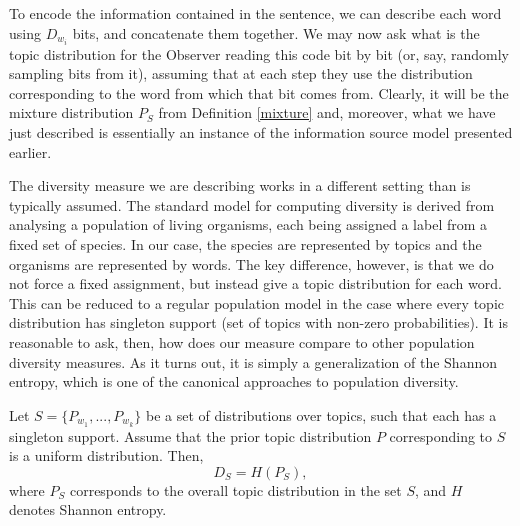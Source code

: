 To encode the information contained in the sentence, we can describe
each word using $D_{w_i}$ bits, and concatenate them together. We may
now ask what is the topic distribution for the Observer reading this
code bit by bit (or, say, randomly sampling bits from it), assuming
that at each step they use the distribution corresponding to the word
from which that bit comes from. Clearly, it will be the mixture
distribution $P_S$ from Definition \ref{mixture} and, moreover, what
we have just described is essentially an instance of the information
source model presented earlier. 

The diversity measure we are describing works in a different setting
than is typically assumed. The standard model for computing diversity
is derived from analysing a population of living organisms, each being
assigned a label from a fixed set of species. In our case, the species
are represented by topics and the organisms are represented by
words. The key difference, however, is that we do not force a fixed
assignment, but instead give a topic distribution for each
word. This can be reduced to a regular population model in the case where
every topic distribution has singleton support (set of topics with
non-zero probabilities). It is
reasonable to ask, then, how does our measure compare to other
population diversity measures. As it turns out, it is simply a
generalization of the Shannon entropy, which is one of the canonical
approaches to population diversity.

\bep\label{entropy}
Let $S=\{P_{w_1},...,P_{w_k}\}$ be a set of distributions over topics,
such that each has a singleton support. Assume that the prior
topic distribution $P$ corresponding to $S$ is a uniform
distribution. Then, 
\[D_S=H(P_S),\]
where $P_S$ corresponds to the overall topic distribution in the set
$S$, and $H$ denotes Shannon entropy.
\eep